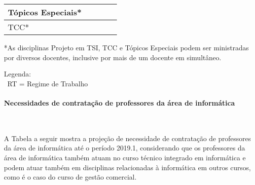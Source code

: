 \begin{table}[h!]
\begin{tabular}{lllll}
\multicolumn{1}{|l|}{T\'opicos Especiais*}                                                      & \multicolumn{1}{l|}{} & \multicolumn{1}{l|}{}  & \multicolumn{1}{l|}{}             & \multicolumn{1}{l|}{}                          \\ \hline
\multicolumn{1}{|l|}{TCC*}                                                         & \multicolumn{1}{l|}{}       & \multicolumn{1}{l|}{} & \multicolumn{1}{l|}{}       & \multicolumn{1}{l|}{}                        \\ \hline
\end{tabular}
\end{table}

\newpage
*As disciplinas Projeto em TSI, TCC e T\'opicos Especiais podem ser ministradas por diversos docentes, inclusive por mais de um docente em simult\^aneo.

Legenda:
\\~RT = Regime de Trabalho

\paragraph{Necessidades de contrata\c{c}\~ao de professores da \'area de inform\'atica}\


A Tabela a seguir mostra a proje\c{c}\~ao de necessidade de contrata\c{c}\~ao de professores da \'area de inform\'atica at\'e o per\'iodo 2019.1, considerando que os professores da \'area de inform\'atica tamb\'em atuam no curso t\'ecnico integrado em inform\'atica e podem atuar tamb\'em em disciplinas relacionadas \`a inform\'atica em outros cursos, como \'e o caso do curso de gest\~ao comercial.

